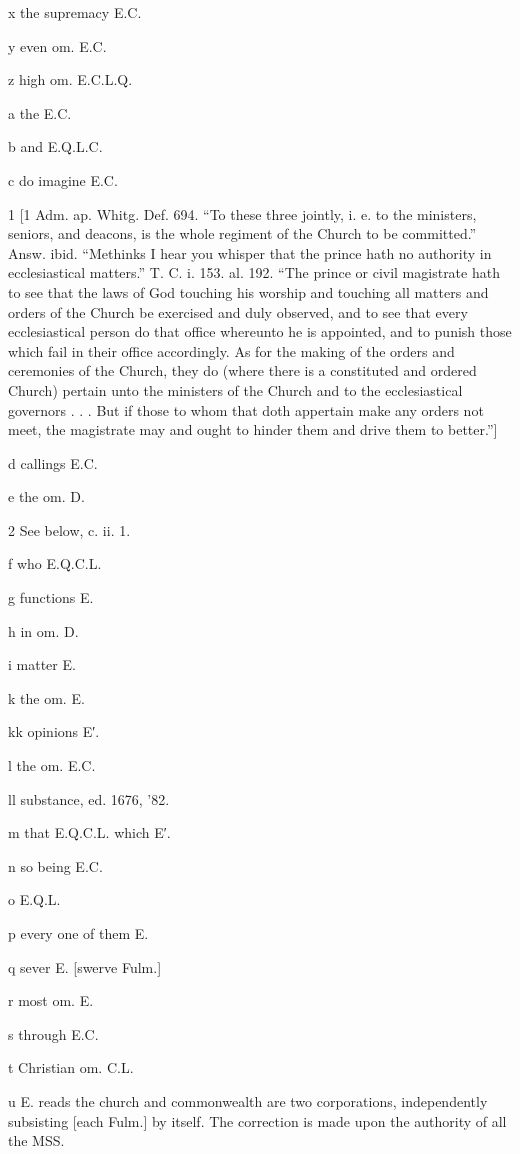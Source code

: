 x
the supremacy E.C.

y
even om. E.C.

z
high om. E.C.L.Q.

a
the E.C.

b
and E.Q.L.C.

c
do imagine E.C.

1
[1 Adm. ap. Whitg. Def. 694. “To these three jointly, i. e. to the ministers, seniors, and deacons, is the whole regiment of the Church to be committed.” Answ. ibid. “Methinks I hear you whisper that the prince hath no authority in ecclesiastical matters.” T. C. i. 153. al. 192. “The prince or civil magistrate hath to see that the laws of God touching his worship and touching all matters and orders of the Church be exercised and duly observed, and to see that every ecclesiastical person do that office whereunto he is appointed, and to punish those which fail in their office accordingly. As for the making of the orders and ceremonies of the Church, they do (where there is a constituted and ordered Church) pertain unto the ministers of the Church and to the ecclesiastical governors . . . But if those to whom that doth appertain make any orders not meet, the magistrate may and ought to hinder them and drive them to better.”]

d
callings E.C.

e
the om. D.

2
See below, c. ii. 1.

f
who E.Q.C.L.

g
functions E.

h
in om. D.

i
matter E.

k
the om. E.

kk
opinions E′.

l
the om. E.C.

ll
substance, ed. 1676, ’82.

m
that E.Q.C.L. which E′.

n
so being E.C.

o
E.Q.L.

p
every one of them E.

q
sever E. [swerve Fulm.]

r
most om. E.

s
through E.C.

t
Christian om. C.L.

u
E. reads the church and commonwealth are two corporations, independently subsisting [each Fulm.] by itself. The correction is made upon the authority of all the MSS.

